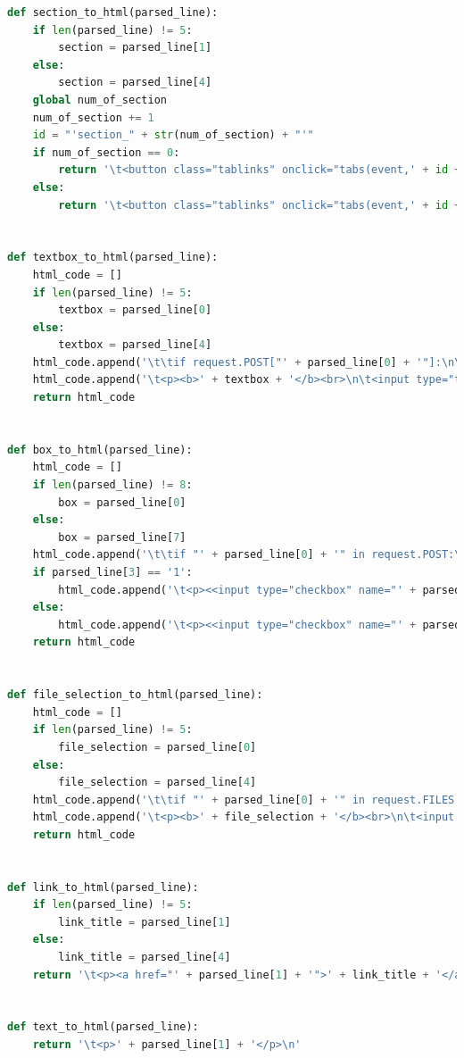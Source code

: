 \begin{lstlisting}[frame=single, label={rndhpcgui.2023.05.04.generation}, caption={Функции создания HTML-кода}, language={Python}] 
    def section_to_html(parsed_line):
    if len(parsed_line) != 5:
        section = parsed_line[1]
    else:
        section = parsed_line[4]
    global num_of_section
    num_of_section += 1
    id = "'section_" + str(num_of_section) + "'"
    if num_of_section == 0:
        return '\t<button class="tablinks" onclick="tabs(event,' + id + ')" id="defaultOpen">' + section + '</button>\n'
    else:
        return '\t<button class="tablinks" onclick="tabs(event,' + id + ')">' + section + '</button>\n'


def textbox_to_html(parsed_line):
    html_code = []
    if len(parsed_line) != 5:
        textbox = parsed_line[0]
    else:
        textbox = parsed_line[4]
    html_code.append('\t\tif request.POST["' + parsed_line[0] + '"]:\n\t\t\t' + parsed_line[0] + ' = request.POST["' + parsed_line[0] + '"]\n')
    html_code.append('\t<p><b>' + textbox + '</b><br>\n\t<input type="text" name="' + parsed_line[0] + '" value="' + parsed_line[2] + '"></p>\n')
    return html_code


def box_to_html(parsed_line):
    html_code = []
    if len(parsed_line) != 8:
        box = parsed_line[0]
    else:
        box = parsed_line[7]
    html_code.append('\t\tif "' + parsed_line[0] + '" in request.POST:\n\t\t\t' + parsed_line[0] + ' = request.POST["' + parsed_line[0] + '"]\n')
    if parsed_line[3] == '1':
        html_code.append('\t<p><<input type="checkbox" name="' + parsed_line[0] + '" value="' + parsed_line[0] + '" checked>' + box + '</p>\n')
    else:
        html_code.append('\t<p><<input type="checkbox" name="' + parsed_line[0] + '" value="' + parsed_line[0] + '">' + box + '</p>\n')
    return html_code


def file_selection_to_html(parsed_line):
    html_code = []
    if len(parsed_line) != 5:
        file_selection = parsed_line[0]
    else:
        file_selection = parsed_line[4]
    html_code.append('\t\tif "' + parsed_line[0] + '" in request.FILES:\n\t\t\t' + parsed_line[0] + ' = request.FILES["' + parsed_line[0] + '"]\n\t\t\tfs = FileSystemStorage()\n\t\t\tfilename = fs.save(' + parsed_line[0] + '.name, ' + parsed_line[0] + ')\n\t\t\tfile_url = fs.url(filename)\n')
    html_code.append('\t<p><b>' + file_selection + '</b><br>\n\t<input type="file" name="' + parsed_line[0] + '"></p>\n')
    return html_code


def link_to_html(parsed_line):
    if len(parsed_line) != 5:
        link_title = parsed_line[1]
    else:
        link_title = parsed_line[4]
    return '\t<p><a href="' + parsed_line[1] + '">' + link_title + '</a></p>\n'


def text_to_html(parsed_line):
    return '\t<p>' + parsed_line[1] + '</p>\n'

\end{lstlisting}



